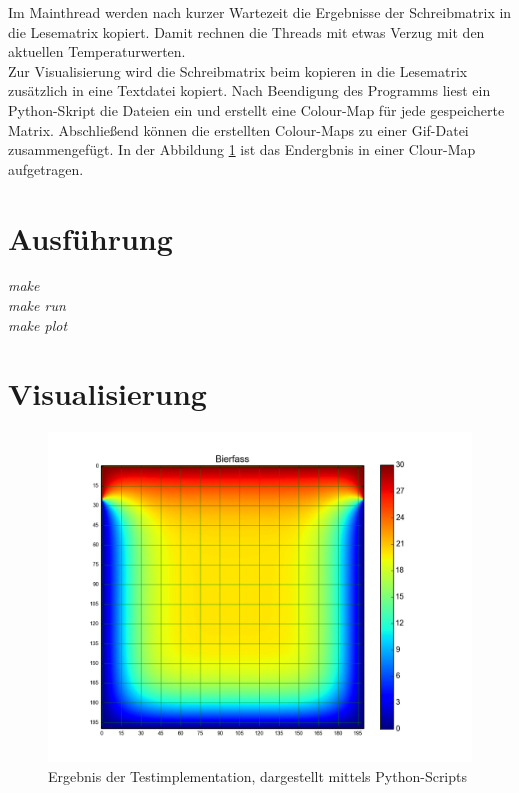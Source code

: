 \documentclass[]{article}
\begin{document}
Im Mainthread werden nach kurzer Wartezeit die Ergebnisse der Schreibmatrix in die Lesematrix kopiert. Damit rechnen die Threads mit etwas Verzug mit den aktuellen Temperaturwerten. \\
Zur Visualisierung wird die Schreibmatrix beim kopieren in die Lesematrix zusätzlich in eine Textdatei kopiert. Nach Beendigung des Programms liest ein Python-Skript die Dateien ein und erstellt eine Colour-Map für jede gespeicherte Matrix. Abschließend können die erstellten Colour-Maps zu einer Gif-Datei zusammengefügt. In der Abbildung \ref{pic:ergebnis} ist das Endergbnis in einer Clour-Map aufgetragen. 


\section*{Ausführung}
\textit{make}\\
\textit{make run}\\
\textit{make plot}

\newpage
\section*{Visualisierung}
\begin{figure}[h]
	\centering 
	\includegraphics[width=1\linewidth]{ergebnis.png}
	\caption{Ergebnis der Testimplementation, dargestellt mittels Python-Scripts}
	\label{pic:ergebnis}
\end{figure}
\end{document}
